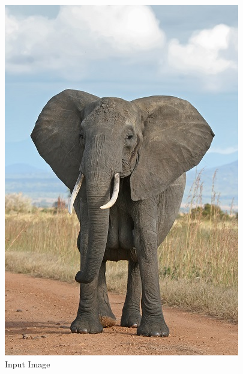 \documentclass[12pt]{article}
\begin{document}
\begin{figure}[!htb]
    \begin{minipage}{0.48\textwidth}
        \centering
        \includegraphics[width=0.9\linewidth]{elephant.jpg}
        \caption{Input Image}
    \end{minipage}\hfill
    \begin{minipage}{0.48\textwidth}
        \centering

\end{minipage}
\end{figure}
\end{document}

